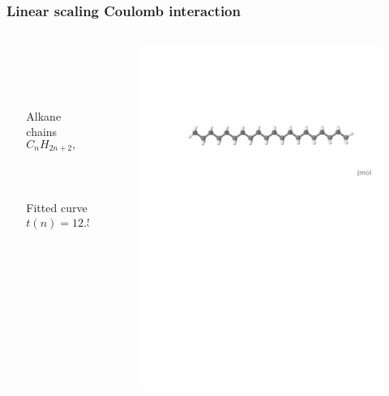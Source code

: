 \begin{frame}
    \frametitle{Linear scaling Coulomb interaction}
    \begin{columns}
    \begin{column}{.10\textwidth}
    \ \\
    \end{column}
    \begin{column}{.40\textwidth}
	\centering
	\ \\
	\ \\
	\ \\
	\ \\
	Alkane chains
	\begin{equation}
	    \nonumber
	    C_{n}H_{2n+2}, \qquad n=2,\dots,70
	\end{equation}
	\ \\
	\ \\
	\ \\
	Fitted curve
	\begin{equation}
	    \nonumber
	    t(n) = 12.5 + 2.34n^{0.754} 
	\end{equation}
    \end{column}
    \begin{column}{.50\textwidth}
	\centering
	\begin{figure}
	    \includegraphics[scale=0.3, clip, viewport = 80 560 600 720]{figures/alkane.pdf}

\end{figure}
\end{column}
\end{columns}
\end{frame}
